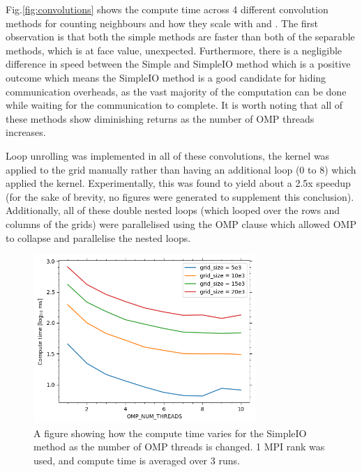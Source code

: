     Fig.\eqref{fig:convolutions} shows the compute time across 4 different convolution methods for counting neighbours
    and how they scale with  and .
    The first observation is that both the simple methods are faster than both of the separable methods, which is
    at face value, unexpected.
    Furthermore, there is a negligible difference in speed between the Simple and SimpleIO method which is a positive
    outcome which means the SimpleIO method is a good candidate for hiding communication overheads, as the vast majority
    of the computation can be done while waiting for the communication to complete.
    It is worth noting that all of these methods show diminishing returns as the number of OMP threads increases.

    Loop unrolling was implemented in all of these convolutions, the kernel was applied
    to the grid manually rather than having an additional loop (0 to 8) which applied the kernel.
    Experimentally, this was found to yield about a 2.5x speedup (for the sake of brevity, no figures were generated to
    supplement this conclusion).
    Additionally, all of these double nested loops (which looped over the rows and columns of the grids) were parallelised
    using the OMP  clause which allowed OMP to collapse and parallelise the
    nested loops.

    \begin{figure}[htb]
    \centering
    \includegraphics[width=0.75\textwidth]{./figures/simpleio}
    \caption{A figure showing how the compute time varies for the SimpleIO method as the number of OMP threads is changed.
    1 MPI rank was used, and compute time is averaged over 3 runs.}
    \label{fig:simpleio}
    \end{figure}

